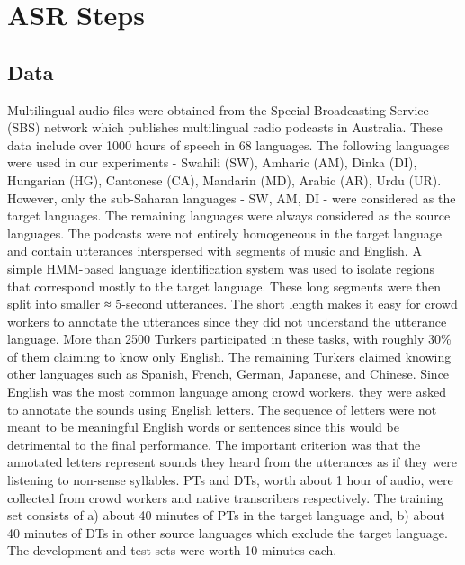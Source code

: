 \documentclass[a4paper]{article}
\begin{document}
\section{ASR Steps}  \vspace{-2mm}
\label{sec:ASR Steps}
\subsection{Data} \vspace{-1mm}
Multilingual audio files were obtained from the Special Broadcasting Service (SBS) network which publishes multilingual radio podcasts in Australia. These data include over 1000 hours of speech in 68 languages.
The following languages were used in our experiments - Swahili (SW), Amharic (AM), Dinka (DI), Hungarian (HG), Cantonese (CA), Mandarin (MD), Arabic (AR), Urdu (UR). However, only the sub-Saharan languages - SW, AM, DI - were considered as the target languages. The remaining languages were always considered as the source languages. The podcasts were not entirely homogeneous in the target language and contain utterances interspersed with segments of music and English. A simple HMM-based language identification system was used to isolate regions that correspond mostly to the target language. These long segments were then split into smaller ≈ 5-second utterances. The short length makes it easy for crowd workers to annotate the utterances since they did not understand the utterance language. More than 2500 Turkers participated in these tasks, with roughly 30\% of them claiming to know only English. The remaining Turkers claimed knowing other languages such as Spanish, French, German, Japanese, and Chinese. Since English was the most common language among crowd workers, they were asked to annotate the sounds using English letters. The sequence of letters were not meant to be meaningful English words or sentences since this would be detrimental to the final performance. The important criterion was that the annotated letters represent sounds they heard from the utterances as if they were listening to non-sense syllables. PTs and DTs, worth about 1 hour of audio, were collected from crowd workers and native transcribers respectively. The training set consists of a) about 40 minutes of PTs in the target language and, b) about 40 minutes of DTs in other source languages which exclude the target language. The development and test sets were worth 10 minutes each. 
\end{document}
